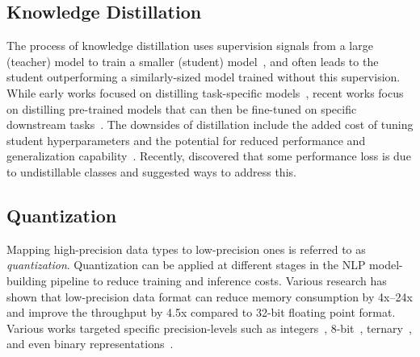 \subsection{Knowledge Distillation}\label{sec:distillation}
The process of knowledge distillation uses supervision signals from a large (teacher) model to train a smaller (student) model~\citep{hinton-2015}, and often leads to the student outperforming a similarly-sized model trained without this supervision. While early works focused on distilling task-specific models~\citep{kim-rush-2016-sequence}, recent works focus on distilling pre-trained models that can then be fine-tuned on specific downstream tasks~\citep{sanh_distilbert_2019,liu-etal-2020-fastbert,jiao-etal-2020-tinybert,sun-etal-2020-mobilebert,Gou:2021}. The downsides of distillation include the added cost of tuning student hyperparameters and the potential for reduced performance and generalization capability~\citep{stanton2021does}. Recently, \citet{zhu2022teach} discovered that some performance loss is due to undistillable classes and suggested ways to address this.

\subsection{Quantization}\label{sec:quantization}
Mapping high-precision data types to low-precision ones is referred to as \textit{quantization}.
Quantization can be applied at different stages in the NLP model-building pipeline to reduce training and inference costs. Various research has shown that low-precision data format can reduce memory consumption by 4x--24x and improve the throughput by 4.5x compared to 32-bit floating point format. Various works targeted specific precision-levels such as integers~\cite{kim_i-bert_2021}, 8-bit~\cite{quinn-ballesteros-2018-pieces, zafrir_q8bert_2019, bhandare_efficient_2019, prato_fully_2020, dettmers2022llm}, ternary~\cite{zhang_ternarybert_2020, ji_distribution_2021,zadeh_mokey_2022}, and even binary representations~\cite{bai_binarybert_2020}.

